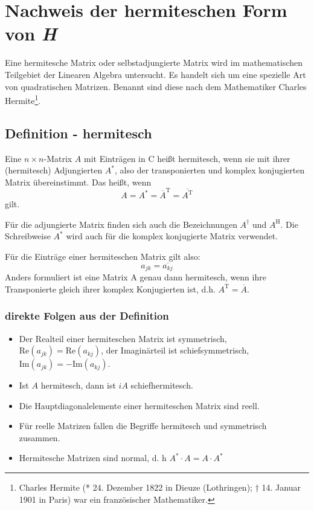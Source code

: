 \chapter{Nachweis der hermiteschen Form von \emph{H}}
Eine hermitesche Matrix oder selbstadjungierte Matrix wird im mathematischen Teilgebiet der Linearen
Algebra untersucht. Es handelt sich um eine spezielle Art von quadratischen Matrizen. Benannt sind
diese nach dem Mathematiker Charles Hermite\footnote{Charles Hermite (* 24. Dezember 1822 in Dieuze
(Lothringen); † 14. Januar 1901 in Paris) war ein französischer Mathematiker.}.

\section{Definition - hermitesch}
Eine \(n \times n\)-Matrix \(A\) mit Einträgen in \(\mathrm{C}\) heißt hermitesch, wenn sie mit
ihrer (hermitesch) Adjungierten \(A^*\), also der transponierten und komplex konjugierten Matrix
übereinstimmt. Das heißt, wenn
\begin{equation}
    A = A^* = \overline A^{\mathrm T} = \overline{A^{\mathrm T}}
\end{equation}
gilt.

Für die adjungierte Matrix finden sich auch die Bezeichnungen \(A^\dagger\) und \(A^{\mathrm H}\).
Die Schreibweise \(A^*\) wird auch für die komplex konjugierte Matrix verwendet.

Für die Einträge einer hermiteschen Matrix gilt also:
\begin{equation}
\label{eq:elements}
    a_{jk} = \overline{a_{kj}}
\end{equation}
Anders formuliert ist eine Matrix A genau dann hermitesch, wenn ihre Transponierte gleich ihrer
komplex Konjugierten ist, d.h. \(A^{\mathrm T} = \overline A\).

\subsection{direkte Folgen aus der Definition}
\begin{itemize}
  \label{item:hermSym}
  \item Der Realteil einer hermiteschen Matrix ist symmetrisch, \(\mathrm{Re}(a_{jk}) =
        \mathrm{Re}(a_{kj})\), der Imaginärteil ist schiefsymmetrisch, \(\mathrm{Im}(a_{jk}) =
        -\mathrm{Im}(a_{kj})\).
  \item Ist \(A\) hermitesch, dann ist \(iA\) schiefhermitesch.
  \item Die Hauptdiagonalelemente einer hermiteschen Matrix sind reell.  
  \item Für reelle Matrizen fallen die Begriffe hermitesch und symmetrisch zusammen.
  \item Hermitesche Matrizen sind normal, d. h \(A^* \cdot A = A\cdot A^*\)
\end{itemize}

